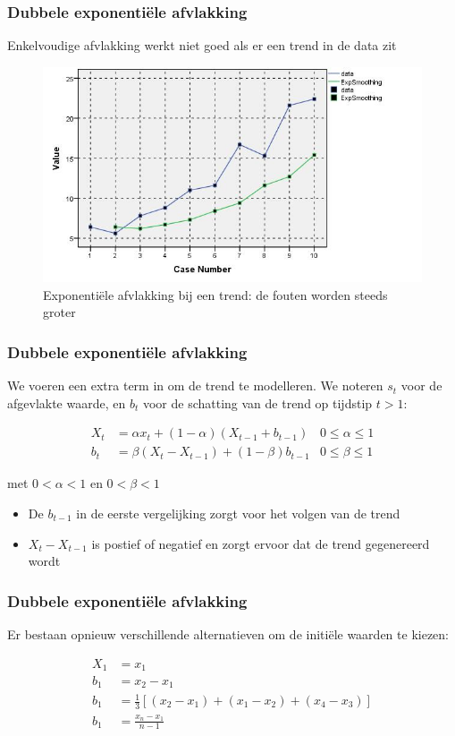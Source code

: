 \documentclass[aspectratio=169]{beamer}
\begin{document}
\begin{frame}
  \frametitle{Dubbele exponenti\"ele afvlakking}

  Enkelvoudige afvlakking werkt niet goed als er een trend in de data zit

  \begin{figure}
    \centering
    \includegraphics[width=.7\textwidth]{img/tijdreeks61}
    \caption{Exponenti\"ele afvlakking bij een trend: de fouten worden steeds groter}
    \label{fig:tijdreeks61}
  \end{figure}

\end{frame}


\begin{frame}
  \frametitle{Dubbele exponentiële afvlakking}

  We voeren een extra term in om de trend te modelleren. We noteren $s_t$ voor de afgevlakte waarde, en $b_t$ voor de schatting van de trend op tijdstip $t > 1$:

\begin{align*}
	X_{t} & = \alpha x_{t} + (1-\alpha)(X_{t-1} + b_{t-1}) & 0 \leq \alpha \leq 1                            \\
	b_{t} & = \beta(X_{t}-X_{t-1}) + (1-\beta)b_{t-1}      & 0 \leq \beta \leq 1 
\label{eq:doubleSmoothing}
\end{align*}

  met $0 < \alpha < 1$ en $0 < \beta < 1$
	
	
	\begin{itemize}
		\item De $ b_{t-1}$ in de eerste vergelijking zorgt voor het volgen van de trend
		\item $X_{t}-X_{t-1}$ is postief of negatief en zorgt ervoor dat de trend gegenereerd wordt
	\end{itemize}
\end{frame}

\begin{frame}
  \frametitle{Dubbele exponentiële afvlakking}
  Er bestaan opnieuw verschillende alternatieven om de initiële waarden te kiezen:

\begin{align*}
	X_{1} &= x_{1} \\
	b_{1} &= x_{2} - x_{1} \\
	b_{1} &= \frac{1}{3}\left[ (x_{2} - x_{1}) + (x_{1} - x_{2}) + (x_{4} - x_{3}) \right]\\
	b_{1} &= \frac{x_{n} - x_{1}}{n-1}
\end{align*}

\end{frame}
\end{document}
